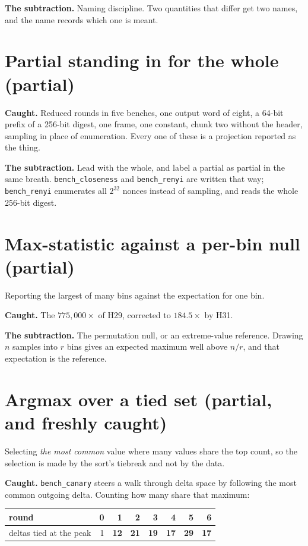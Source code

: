 \textbf{The subtraction.} Naming discipline. Two quantities that differ get two names, and the name records which one is meant.

\section{Partial standing in for the whole (partial)}

\textbf{Caught.} Reduced rounds in five benches, one output word of eight, a 64-bit prefix of a 256-bit digest, one frame, one constant, chunk two without the header, sampling in place of enumeration. Every one of these is a projection reported as the thing.

\textbf{The subtraction.} Lead with the whole, and label a partial as partial in the same breath. \texttt{bench\_closeness} and \texttt{bench\_renyi} are written that way; \texttt{bench\_renyi} enumerates all \(2^{32}\) nonces instead of sampling, and reads the whole 256-bit digest.

\section{Max-statistic against a per-bin null (partial)}

Reporting the largest of many bins against the expectation for one bin.

\textbf{Caught.} The \(775{,}000\times\) of H29, corrected to \(184.5\times\) by H31.

\textbf{The subtraction.} The permutation null, or an extreme-value reference. Drawing \(n\) samples into \(r\) bins gives an expected maximum well above \(n/r\), and that expectation is the reference.

\section{Argmax over a tied set (partial, and freshly caught)}

Selecting \emph{the most common} value where many values share the top count, so the selection is made by the sort's tiebreak and not by the data.

\textbf{Caught.} \texttt{bench\_canary} steers a walk through delta space by following the most common outgoing delta. Counting how many share that maximum:

\begin{center}
\begin{tabular}{@{}lrrrrrrr@{}}
\toprule
round & 0 & 1 & 2 & 3 & 4 & 5 & 6 \\
\midrule
deltas tied at the peak & 1 & \textbf{12} & \textbf{21} & \textbf{19} & \textbf{17} & \textbf{29} & \textbf{17} \\
\bottomrule
\end{tabular}
\end{center}

